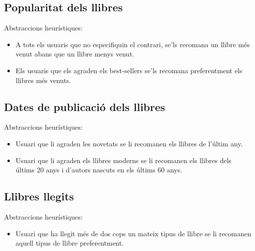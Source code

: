 \subsection{Popularitat dels llibres}
Abstraccions heurístiques:
\begin{itemize}
  \item A tots els usuaris que no especifiquin el contrari, se'ls recomana un llibre més venut abans que un llibre menys venut.
  \item Els usuaris que els agraden els best-sellers se'ls recomana preferentment els llibres més venuts.
\end{itemize}

\subsection{Dates de publicació dels llibres}
Abstraccions heurístiques:
\begin{itemize}
  \item Usuari que li agraden les novetats se li recomanen els llibres de l'últim any.
  \item Usuari que li agraden els llibres moderns se li recomanen els llibres dels  últims 20 anys i d'autors nascuts en els últims 60 anys.
\end{itemize}

\subsection{Llibres llegits}
Abstraccions heurístiques:
\begin{itemize}
  \item Usuari que ha llegit més de dos cops un mateix tipus de llibre se li recomanen aquell tipus de llibre preferentment.
\end{itemize}




